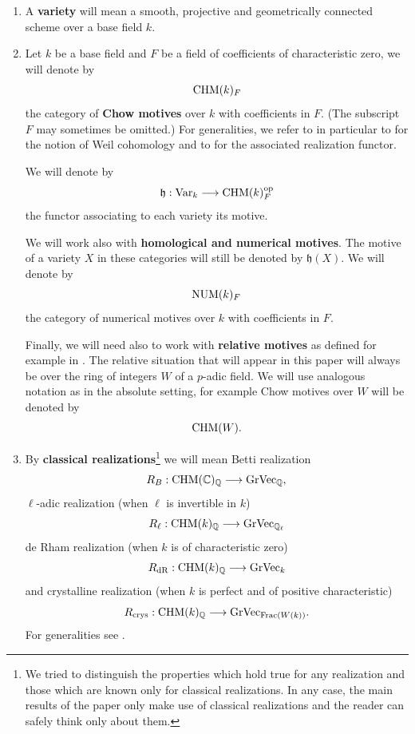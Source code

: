 \begin{enumerate}
\item  A \textbf{variety} will mean a smooth, projective and geometrically connected scheme over a base  field  $k$.



\item Let  $k$ be a base field and $F$ be a field of coefficients of characteristic zero, we will denote by \[\mathrm{CHM}(k)_{F}\] the category of  \textbf{Chow motives} over $k$ with coefficients in $F$. (The subscript $F$ may sometimes be omitted.) For generalities, we refer to \cite{Andmot} in particular to \cite[Definition 3.3.1.1]{Andmot}  for the notion of Weil cohomology and to \cite[Proposition 4.2.5.1]{Andmot}  for the associated realization functor.

We will denote by
\[\mathfrak{h} : \textnormal{Var}_k\longrightarrow \mathrm{CHM}(k)_{F}^{\textnormal{op}}\]
the functor associating to each variety its motive.

We will work also with \textbf{homological and numerical motives}. The motive of a variety $X$ in these categories will still be denoted by $\mathfrak{h} (X)$. We will denote by
\[\mathrm{NUM}(k)_F\]
the category of numerical motives over $k$ with coefficients in $F$.

Finally, we will need also to work with  \textbf{relative motives} as defined for example in \cite[\S 5.1]{OS2}.  The relative situation that will appear in this paper will always be over the ring of integers $W$ of a $p$-adic field. We will use analogous notation as in the absolute setting, for example Chow motives over $W$ will be denoted by \[\mathrm{CHM}(W).\]

\item By \textbf{classical realizations}\footnote{We tried to distinguish the properties which hold true for any realization and those which are known only for classical realizations.  In any case, the main results of the paper only make use of classical realizations and the reader can safely think only about them.} we will mean Betti realization
\[R_B : \mathrm{CHM}(\mathbb{C})_{\mathbb{Q}}\longrightarrow \textnormal{GrVec}_{\mathbb{Q}},\]
  $\ell$-adic realization (when $\ell$ is invertible in $k$)
\[R_\ell : \mathrm{CHM}(k)_{\mathbb{Q}}\longrightarrow \textnormal{GrVec}_{\mathbb{Q}_\ell}\]
 de Rham realization (when $k$ is of characteristic zero)
\[R_{\mathrm{dR}} : \mathrm{CHM}(k)_{\mathbb{Q}}\longrightarrow \textnormal{GrVec}_{k}\]
and crystalline realization (when $k$ is perfect and of positive characteristic)
\[R_{\textnormal{crys}} : \mathrm{CHM}(k)_{\mathbb{Q}}\longrightarrow \textnormal{GrVec}_{\mathrm{Frac} (W(k))}.\]
 For generalities see  \cite[\S 3.4.2 and Proposition 4.2.5.1]{Andmot}.



\end{enumerate}
